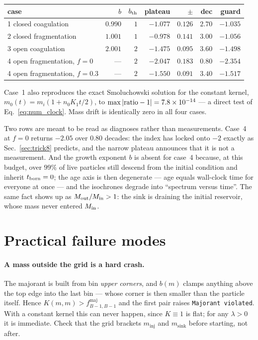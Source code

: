 \documentclass[a4paper,12pt]{article}
\newcommand{\minj}{m_{\mathrm{inj}}}
\newcommand{\msink}{m_{\mathrm{sink}}}
\newcommand{\fmaj}{f^{\mathrm{maj}}}
\newcommand{\code}[1]{\texttt{#1}}
\begin{document}
\begin{center}
\small
\begin{tabular}{@{}l r r r r r r@{}}
\toprule
case & $b$ & $b_{\rm th}$ & plateau & $\pm$ & dec & guard \\
\midrule
1 closed coagulation      & $0.990$ & $1$ & $-1.077$ & $0.126$ & $2.70$ & $-1.035$ \\
2 closed fragmentation    & $1.001$ & $1$ & $-0.978$ & $0.141$ & $3.00$ & $-1.056$ \\
3 open coagulation        & $2.001$ & $2$ & $-1.475$ & $0.095$ & $3.60$ & $-1.498$ \\
4 open fragmentation, $f=0$   & --- & $2$ & $-2.047$ & $0.183$ & $0.80$ & $-2.354$ \\
4 open fragmentation, $f=0.3$ & --- & $2$ & $-1.550$ & $0.091$ & $3.40$ & $-1.517$ \\
\bottomrule
\end{tabular}
\end{center}

Case~1 also reproduces the exact Smoluchowski solution for the constant
kernel, $m_0(t) = m_i(1+n_0K_1t/2)$, to $\max|{\rm ratio}-1| = 7.8\times10^{-14}$
--- a direct test of Eq.~\eqref{eq:num_clock}. Mass drift is identically zero
in all four cases.

Two rows are meant to be read as diagnoses rather than measurements. Case~4
at $f=0$ returns $-2.05$ over $0.80$ decades: the index has locked onto $-2$
exactly as Sec.~\ref{sec:trick8} predicts, and the narrow plateau announces
that it is not a measurement. And the growth exponent $b$ is absent for
case~4 because, at this budget, over $99\%$ of live particles still descend
from the initial condition and inherit $t_{\rm born}=0$; the age axis is then
degenerate --- age equals wall-clock time for everyone at once --- and the
isochrones degrade into ``spectrum versus time''. The same fact shows up as
$M_{\rm out}/M_{\rm in} > 1$: the sink is draining the initial reservoir,
whose mass never entered $M_{\rm in}$.

\section{Practical failure modes}
\label{sec:num_pitfalls}

\paragraph{A mass outside the grid is a hard crash.}
The majorant is built from bin \emph{upper corners}, and $b(m)$ clamps
anything above the top edge into the last bin --- whose corner is then
smaller than the particle itself. Hence $K(m,m) > \fmaj_{B-1,B-1}$ and the
first pair raises \code{Majorant violated}. With a constant kernel this can
never happen, since $K\equiv1$ is flat; for any $\lambda>0$ it is immediate.
Check that the grid brackets $\minj$ and $\msink$ before starting, not after.
\end{document}
